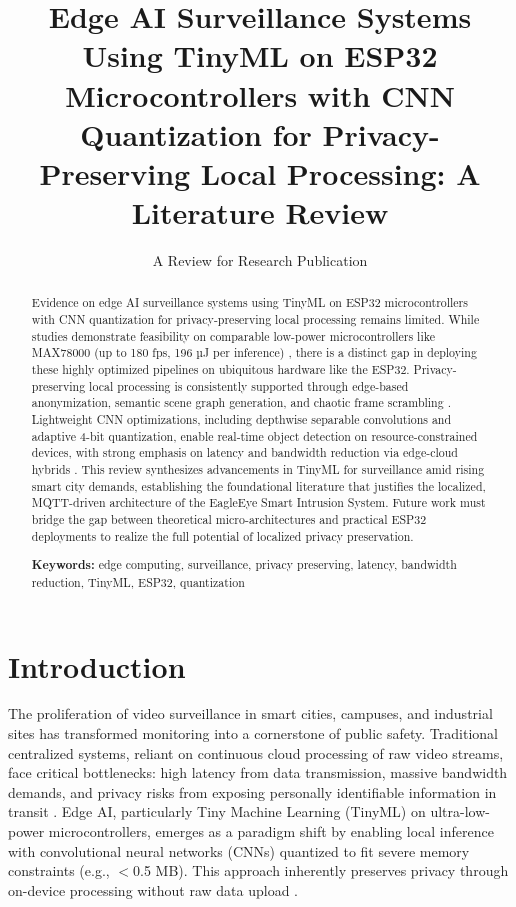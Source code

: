 \documentclass[12pt, a4paper]{article}
\title{\textbf{Edge AI Surveillance Systems Using TinyML on ESP32 Microcontrollers with CNN Quantization for Privacy-Preserving Local Processing: A Literature Review}}
\author{A Review for Research Publication}
\date{}
\begin{document}
\maketitle

\begin{abstract}
Evidence on edge AI surveillance systems using TinyML on ESP32 microcontrollers with CNN quantization for privacy-preserving local processing remains limited. While studies demonstrate feasibility on comparable low-power microcontrollers like MAX78000 (up to 180 fps, 196 µJ per inference) \cite{moosmann2023}, there is a distinct gap in deploying these highly optimized pipelines on ubiquitous hardware like the ESP32. Privacy-preserving local processing is consistently supported through edge-based anonymization, semantic scene graph generation, and chaotic frame scrambling \cite{yuan2020, huang2023, fitwi2021}. Lightweight CNN optimizations, including depthwise separable convolutions and adaptive 4-bit quantization, enable real-time object detection on resource-constrained devices, with strong emphasis on latency and bandwidth reduction via edge-cloud hybrids \cite{zhao2020, chin2022}. This review synthesizes advancements in TinyML for surveillance amid rising smart city demands, establishing the foundational literature that justifies the localized, MQTT-driven architecture of the EagleEye Smart Intrusion System. Future work must bridge the gap between theoretical micro-architectures and practical ESP32 deployments to realize the full potential of localized privacy preservation.

\textbf{Keywords:} edge computing, surveillance, privacy preserving, latency, bandwidth reduction, TinyML, ESP32, quantization
\end{abstract}

\section{Introduction}
The proliferation of video surveillance in smart cities, campuses, and industrial sites has transformed monitoring into a cornerstone of public safety. Traditional centralized systems, reliant on continuous cloud processing of raw video streams, face critical bottlenecks: high latency from data transmission, massive bandwidth demands, and privacy risks from exposing personally identifiable information in transit \cite{myneni2022, yuan2020}. Edge AI, particularly Tiny Machine Learning (TinyML) on ultra-low-power microcontrollers, emerges as a paradigm shift by enabling local inference with convolutional neural networks (CNNs) quantized to fit severe memory constraints (e.g., $<$0.5 MB). This approach inherently preserves privacy through on-device processing without raw data upload \cite{moosmann2023}. 
\end{document}

